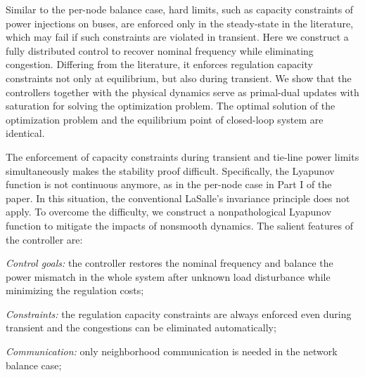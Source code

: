 
% 
 
Similar to the per-node balance case, hard limits, such as capacity constraints of power injections on buses, are enforced only in the steady-state in the literature, which may fail if such constraints are violated in transient. Here we construct a fully distributed control to recover nominal frequency while eliminating congestion. Differing from the literature, it enforces regulation capacity constraints not only at equilibrium, but also during transient. We show that the controllers together with the physical dynamics serve as  primal-dual updates with saturation for solving the optimization problem. 
The optimal solution of the optimization problem and the equilibrium point of closed-loop system are identical. 

The  enforcement of capacity constraints during transient and tie-line power limits simultaneously makes the stability proof difficult. Specifically, the Lyapunov function  is not continuous anymore, as in the per-node case in Part I of the paper. In this situation, the conventional LaSalle's invariance principle does not apply. To overcome the difficulty, we construct a nonpathological Lyapunov function to mitigate the impacts of nonsmooth dynamics. The salient features of the controller are: 
\bee
\item \emph{Control goals:} the controller restores the nominal frequency and balance the power mismatch in the whole system after unknown load disturbance while minimizing the regulation costs; 

\item \emph{Constraints:} the regulation capacity constraints are always enforced even during transient and the congestions can be eliminated automatically; 

\item \emph{Communication:} only neighborhood communication is needed in the  network balance case;

%
%

